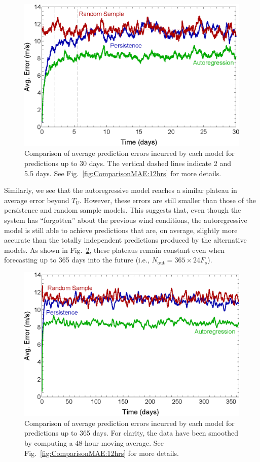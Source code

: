 \documentclass[11pt, oneside]{article}
\newcommand{\figref}[1]{Fig.~\ref{#1}}
\begin{document}
\begin{figure}[htb]
\centering
\includegraphics[width=0.7\columnwidth]{figures/ComparisonAvgPredictionError_30days}
\caption{Comparison of average prediction errors incurred by each model for predictions up to 30 days.
The vertical dashed lines indicate 2 and 5.5 days.
See \figref{fig:ComparisonMAE:12hrs} for more details.}
\label{fig:ComparisonMAE:30days}
\end{figure}

Similarly, we see that the autoregressive model reaches a similar plateau in average error beyond $T_U$.
However, these errors are still smaller than those of the persistence and random sample models.
This suggests that, even though the system has ``forgotten'' about the previous wind conditions, the autoregressive model is still able to achieve predictions that are, on average, slightly more accurate than the totally independent predictions produced by the alternative models.
As shown in \figref{fig:ComparisonMAE:365days}, these plateaus remain constant even when forecasting up to 365 days into the future (i.e., $N_\text{out} = 365 \times 24 F_s$).

\begin{figure}[htb]
\centering
\includegraphics[width=0.7\columnwidth]{figures/ComparisonAvgPredictionError_365days}
\caption{Comparison of average prediction errors incurred by each model for predictions up to 365 days.
For clarity, the data have been smoothed by computing a 48-hour moving average.
See \figref{fig:ComparisonMAE:12hrs} for more details.}
\label{fig:ComparisonMAE:365days}
\end{figure}
\end{document}
